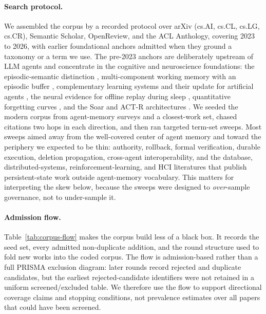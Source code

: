 \paragraph{Search protocol.} We assembled the corpus by a recorded protocol over arXiv (cs.AI, cs.CL, cs.LG, cs.CR), Semantic Scholar, OpenReview, and the ACL Anthology, covering 2023 to 2026, with earlier foundational anchors admitted when they ground a taxonomy or a term we use. The pre-2023 anchors are deliberately upstream of LLM agents and concentrate in the cognitive and neuroscience foundations: the episodic-semantic distinction \citep{tulving1972episodic}, multi-component working memory with an episodic buffer \citep{baddeley2000episodic}, complementary learning systems and their update for artificial agents \citep{mcclelland1995complementary,kumaran2016complementary}, the neural evidence for offline replay during sleep \citep{wilson1994reactivation}, quantitative forgetting curves \citep{murre2015replication}, and the Soar and ACT-R architectures \citep{laird2012soar,anderson2004actr}. We seeded the modern corpus from agent-memory surveys and a closest-work set, chased citations two hops in each direction, and then ran targeted term-set sweeps. Most sweeps aimed away from the well-covered center of agent memory and toward the periphery we expected to be thin: authority, rollback, formal verification, durable execution, deletion propagation, cross-agent interoperability, and the database, distributed-systems, reinforcement-learning, and HCI literatures that publish persistent-state work outside agent-memory vocabulary. This matters for interpreting the skew below, because the sweeps were designed to \emph{over}-sample governance, not to under-sample it.

\paragraph{Admission flow.} Table~\ref{tab:corpus-flow} makes the corpus build less of a black box. It records the seed set, every admitted non-duplicate addition, and the round structure used to fold new works into the coded corpus. The flow is admission-based rather than a full PRISMA exclusion diagram: later rounds record rejected and duplicate candidates, but the earliest rejected-candidate identifiers were not retained in a uniform screened/excluded table. We therefore use the flow to support directional coverage claims and stopping conditions, not prevalence estimates over all papers that could have been screened.

